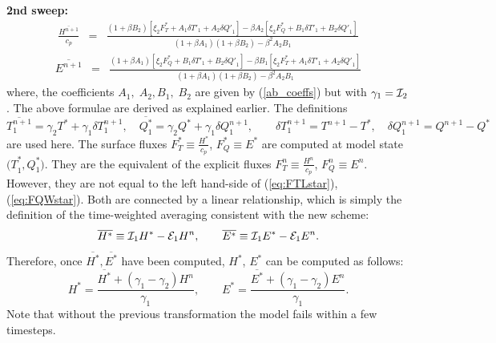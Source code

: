 \documentclass{UMDP_article}
\begin{document}
\noindent \textbf{2nd sweep:}
\begin{eqnarray}
  \frac{\overline{H^{n+1}}}{c_{p}} & = & \frac{(1+\beta B_{2})[\xi_{2}F_{T}^{*}+A_{1}\delta{T'}_{1}+A_{2}\delta{Q'}_{1}]-\beta A_{2}[\xi_{2}F_{Q}^{*}+B_{1}\delta{T'}_{1}+B_{2}\delta{Q'}_{1}]}{(1+\beta A_{1})(1+\beta B_{2})-\beta^{2}A_{2}B_{1}}\label{eq:FTLnp1}
\end{eqnarray}
\begin{eqnarray}
  \overline{E^{n+1}} & = & \frac{(1+\beta A_{1})[\xi_{2}F_{Q}^{*}+B_{1}\delta{T'}_{1}+B_{2}\delta{Q'}_{1}]-\beta B_{1}[\xi_{2}F_{T}^{*}+A_{1}\delta{T'}_{1}+A_{2}\delta{Q'}_{1}]}{(1+\beta A_{1})(1+\beta B_{2})-\beta^{2}A_{2}B_{1}}\label{eq:FQWnp1}
\end{eqnarray}
where, the coefficients $A_{1},\; A_{2},B_{1},\; B_{2}$ are given by
(\ref{ab_coeffs}) but with $\gamma_{1}={\cal I}_{2}$. The above
formulae are derived as explained earlier. The definitions
\begin{equation*}
  \overline{T_{1}^{n+1}}=\gamma_{2}T^{*}+\gamma_{1}\delta T_{1}^{n+1},\quad\overline{Q_{1}^{*}}=\gamma_{2}Q^{*}+\gamma_{1}\delta Q_{1}^{n+1},\qquad\delta T_{1}^{n+1}=T^{n+1}-T^{*},\quad\delta Q_{1}^{n+1}=Q^{n+1}-Q^{*}
\end{equation*}
are used here. The surface fluxes $F_{T}^{*}\equiv{\displaystyle
  \frac{H^{*}}{c_{p}}}$, $F_{Q}^{*}\equiv E^{*}$ are computed at model
state ${(T}_{1}^{*},Q_{1}^{*})$.  They are the equivalent of the
explicit fluxes $F_{T}^{n}\equiv{\displaystyle \frac{H^{n}}{c_{p}}}$,
$F_{Q}^{n}\equiv E^{n}$. However, they are not equal to the left
hand-side of (\ref{eq:FTLstar}), (\ref{eq:FQWstar}). Both are
connected by a linear relationship, which is simply the definition of
the time-weighted averaging consistent with the new scheme:
\begin{equation*}
  \overline{H^{*}}\equiv{\cal I}_{1}H^{*}-{\cal E}_{1}H^{n},\qquad\overline{E^{*}}\equiv{\cal I}_{1}E^{*}-{\cal E}_{1}E^{n}.
\end{equation*}
Therefore, once $\overline{H^{*}},\overline{E^{*}}$ have been
computed, $H^{*}$, $E^{*}$ can be computed as follows:
\begin{equation*}
  H^{*}=\frac{\overline{H^{*}}+(\gamma_{1}-\gamma_{2})H^{n}}{\gamma_{1}},\qquad
  E^{*}=\frac{\overline{E^{*}}+(\gamma_{1}-\gamma_{2})E^{n}}{\gamma_{1}}.
\end{equation*}
Note that without the previous transformation the model fails within a
few timesteps.
\end{document}
